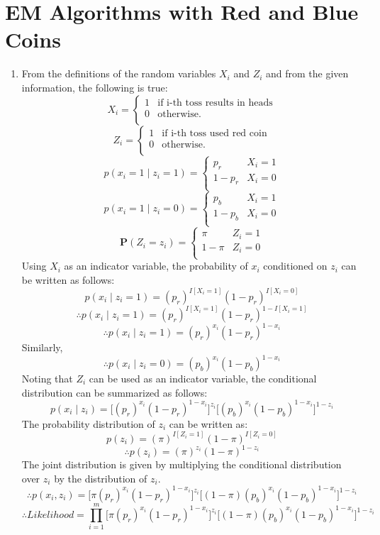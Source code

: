 \documentclass[english]{article}
\begin{document}
\section{EM Algorithms with Red and Blue Coins}
\begin{enumerate}
    \item From the definitions of the random variables $X_i$ and $Z_i$ and from the given information, the following is true:
    \[ X_i = \begin{cases} 
    1 & \mbox{if i-th toss results in heads} \\
    0 & \mbox{otherwise.} \\
    \end{cases}
    \]
    \[ Z_i = \begin{cases} 
    1 & \mbox{if i-th toss used red coin} \\
    0 & \mbox{otherwise.} \\
    \end{cases}
    \]
    \[ p(x_i = 1 \;|\; z_i = 1) = \begin{cases} 
    p_r & X_i = 1\\
    1-p_r & X_i = 0 \\
    \end{cases}
    \]
    \[ p(x_i = 1 \;|\; z_i = 0) = \begin{cases} 
    p_b & X_i = 1\\
    1-p_b & X_i = 0 \\
    \end{cases}
    \]
    \[ \mathbf{P}(Z_i = z_i) = \begin{cases} 
    \pi &  Z_i = 1\\
    1-\pi & Z_i = 0 \\
    \end{cases}
    \]
    Using $X_i$ as an indicator variable, the probability of $x_i$ conditioned on $z_i$ can be written as follows:
    $$p(x_i \;|\; z_i = 1) = (p_r)^{I[X_i = 1]}({1 - p_r})^{I[X_i = 0]}$$
    $$\therefore p(x_i \;|\; z_i = 1) = (p_r)^{I[X_i = 1]}({1 - p_r})^{1 - I[X_i = 1]}$$
    $$\therefore p(x_i \;|\; z_i = 1) = (p_r)^{x_i}({1 - p_r})^{1 - x_i}$$
    Similarly,
    $$\therefore p(x_i \;|\; z_i = 0) = (p_b)^{x_i}({1 - p_b})^{1 - x_i}$$
    Noting that $Z_i$ can be used as an indicator variable, the conditional distribution can be summarized as follows:
    $$p(x_i \;|\; z_i) = \big[(p_r)^{x_i}({1 - p_r})^{1 - x_i}\big]^{z_i} \big[(p_b)^{x_i}({1 - p_b})^{1 - x_i}\big]^{1-z_i}$$
    The probability distribution of $z_i$ can be written as:
    $$p(z_i) = (\pi)^{I[Z_i = 1]}({1 - \pi})^{I[Z_i = 0]}$$
    $$\therefore p(z_i) = (\pi)^{z_i}({1 - \pi})^{1 - z_i}$$
    The joint distribution is given by multiplying the conditional distribution over $z_i$ by the distribution of $z_i$.
    $$\therefore p(x_i,z_i) = \big[\pi(p_r)^{x_i}({1 - p_r})^{1 - x_i}\big]^{z_i} \big[(1-\pi)(p_b)^{x_i}({1 - p_b})^{1 - x_i}\big]^{1-z_i}$$
    $$\therefore \boxed{Likelihood = \prod_{i = 1}^{m} \big[\pi(p_r)^{x_i}({1 - p_r})^{1 - x_i}\big]^{z_i} \big[(1-\pi)(p_b)^{x_i}({1 - p_b})^{1 - x_i}\big]^{1-z_i}}$$
    

\end{enumerate}
\end{document}

